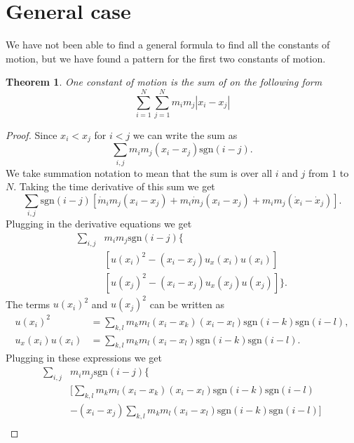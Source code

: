 \documentclass[english,master]{liumaiex}
\theoremstyle{plain}
\newtheorem{theorem}[proposition]{Theorem}
\theoremstyle{definition}
\newcommand{\sgn}{\text{sgn}}
\begin{document}
\section{General case}

We have not been able to find a general formula to find all the constants of motion, but we have found a pattern for the first two constants of motion.

\begin{theorem}
	One constant of motion is the sum of on the following form	
	\begin{equation}
		\sum_{i=1}^{N}\sum_{j=1}^N m_i m_j |x_i - x_j|
	\end{equation}
\end{theorem}
\begin{proof}
	Since $x_i < x_j$ for $i < j$ we can write the sum as
	\begin{equation}
		\sum_{i,j} m_i m_j (x_i - x_j) \sgn(i - j).
	\end{equation}
	We take summation notation to mean that the sum is over all $i$ and $j$ from $1$ to $N$.
	Taking the time derivative of this sum we get
	\begin{equation}
		\sum_{i,j} \sgn(i - j)[
			\dot{m}_i m_j (x_i - x_j) 
			+ m_i \dot{m}_j (x_i - x_j)
			+ m_i m_j (\dot{x}_i - \dot{x}_j)].
	\end{equation}
	Plugging in the derivative equations we get
	\begin{equation}
	\begin{aligned}
		\sum_{i,j} & m_i m_j \sgn(i - j) \{ \\
			& [u(x_i)^2 - (x_i - x_j) u_x(x_i) u(x_i)] \\
			& [u(x_j)^2 - (x_i - x_j) u_x(x_j) u(x_j)]\}.
	\end{aligned}
	\end{equation}
	The terms $u(x_i)^2$ and $u(x_j)^2$ can be written as
	\begin{align}
		u(x_i)^2 &= \sum_{k,l} m_k m_l (x_i - x_k) (x_i - x_l) \sgn(i - k) \sgn(i - l), \\
		u_x(x_i) u(x_i) &= \sum_{k,l} m_k m_l (x_i - x_l) \sgn(i - k) \sgn(i - l).
	\end{align}
	Plugging in these expressions we get
	\begin{equation}
	\begin{aligned}
		\sum_{i,j} &m_i m_j \sgn(i - j) \{\\
			&[\sum_{k,l} m_k m_l (x_i - x_k) (x_i - x_l) \sgn(i - k) \sgn(i - l)\\
			&-(x_i - x_j)\sum_{k,l} m_k m_l (x_i - x_l) \sgn(i - k) \sgn(i - l)]\\

\end{aligned}
\end{equation}
\end{proof}
\end{document}
